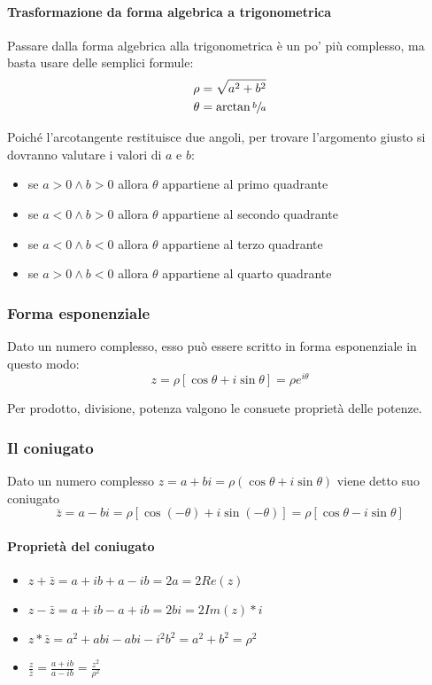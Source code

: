 \paragraph{Trasformazione da forma algebrica a trigonometrica} Passare dalla forma 
algebrica alla trigonometrica è un po' più complesso, ma basta usare delle 
semplici formule:
\begin{align*}
    \rho &= \sqrt{a^2 + b^2} \\
    \theta &= \arctan \sfrac{b}{a}
\end{align*}

Poiché l'arcotangente restituisce due angoli, per trovare l'argomento giusto
si dovranno valutare i valori di $a$ e $b$:
\begin{itemize}
    \item se $a > 0 \wedge b > 0$ allora $\theta$ appartiene al primo quadrante
    \item se $a < 0 \wedge b > 0$ allora $\theta$ appartiene al secondo quadrante
    \item se $a < 0 \wedge b < 0$ allora $\theta$ appartiene al terzo quadrante
    \item se $a > 0 \wedge b < 0$ allora $\theta$ appartiene al quarto quadrante
\end{itemize}

\subsubsection{Forma esponenziale}
Dato un numero complesso, esso può essere scritto in forma esponenziale in questo
modo:
\[ z = \rho [\cos\theta + i\sin\theta] = \rho e^{i\theta} \]

Per prodotto, divisione, potenza valgono le consuete proprietà delle potenze.

\subsubsection{Il coniugato}
Dato un numero complesso $z = a+bi = \rho(\cos\theta + i\sin\theta)$ viene detto
suo coniugato 
\[ 
    \bar{z} = a - bi = \rho[\cos(-\theta) + i\sin(-\theta)] = \rho[\cos\theta - i\sin\theta]
\]

\paragraph{Proprietà del coniugato}
\begin{itemize}
    \item $z + \bar{z} = a + ib + a - ib = 2a = 2Re(z)$
    \item $z - \bar{z} = a + ib - a + ib = 2bi = 2Im(z) * i$
    \item $z * \bar{z} = a^2 + abi - abi - i^2 b^2 = a^2 + b^2 = \rho^2$
    \item $\frac{z}{\bar{z}} = \frac{a+ib}{a-ib} = \frac{z^2}{\rho^2}$
\end{itemize}

